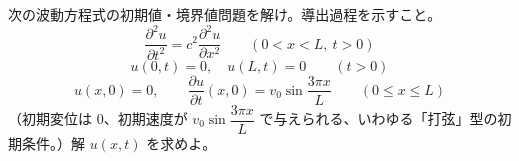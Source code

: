 
次の波動方程式の初期値・境界値問題を解け。導出過程を示すこと。
\[
\frac{\partial^{2} u}{\partial t^{2}} = c^{2}\frac{\partial^{2} u}{\partial x^{2}} \qquad (0 < x < L,\ t > 0)
\]
\[
u(0,t) = 0,\quad u(L,t) = 0 \qquad (t > 0)
\]
\[
u(x,0) = 0, \qquad \frac{\partial u}{\partial t}(x,0) = v_{0}\sin\frac{3\pi x}{L} \qquad (0 \le x \le L)
\]
（初期変位は $0$、初期速度が $v_{0}\sin\dfrac{3\pi x}{L}$ で与えられる、いわゆる「打弦」型の初期条件。）解 $u(x,t)$ を求めよ。
